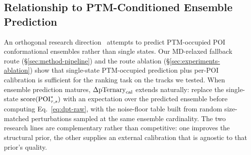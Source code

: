 \subsection{Relationship to PTM-Conditioned Ensemble Prediction}
\label{sec:discussion-ensemble}

An orthogonal research direction~\cite{af3-2024} attempts to predict PTM-occupied POI conformational ensembles rather than single states. Our MD-relaxed fallback route (\S\ref{sec:method-pipeline}) and the route ablation (\S\ref{sec:experiments-ablation}) show that single-state PTM-occupied prediction plus per-POI calibration is sufficient for the ranking task on the tracks we tested. When ensemble prediction matures, $\Delta\mathrm{pTernary}_{\mathrm{cal}}$ extends naturally: replace the single-state $\mathrm{score}(\mathrm{POI}^{*}_{\tau,s})$ with an expectation over the predicted ensemble before computing Eq.~\ref{eq:dpt-raw}, with the noise-floor table built from random size-matched perturbations sampled at the same ensemble cardinality. The two research lines are complementary rather than competitive: one improves the structural prior, the other supplies an external calibration that is agnostic to that prior's quality.
